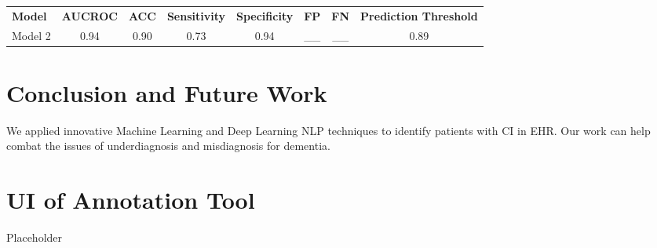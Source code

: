 \documentclass[pmlr,twocolumn,10pt]{jmlr} %
\begin{document}
\begin{table*}[hbtp]
  {\begin{tabular}{lccccccc}
    \toprule 
    
    \bfseries Model & \bfseries AUCROC & \bfseries ACC & \bfseries Sensitivity & \bfseries Specificity & \bfseries FP & \bfseries FN & \bfseries Prediction Threshold \\ 
    Model 2 & 0.94 & 0.90 & 0.73 & 0.94 & __ & __ & 0.89 \\
    
    \bottomrule
  \end{tabular}}
 
\end{table*}

\section{Conclusion and Future Work} 
\label{sec:ConclusionFutureWork} We applied innovative Machine Learning and Deep Learning NLP techniques to identify patients with CI in EHR. Our work can help combat the issues of underdiagnosis and misdiagnosis for dementia. %

\clearpage
\appendix

\section{UI of Annotation Tool}
Placeholder

\end{document}
